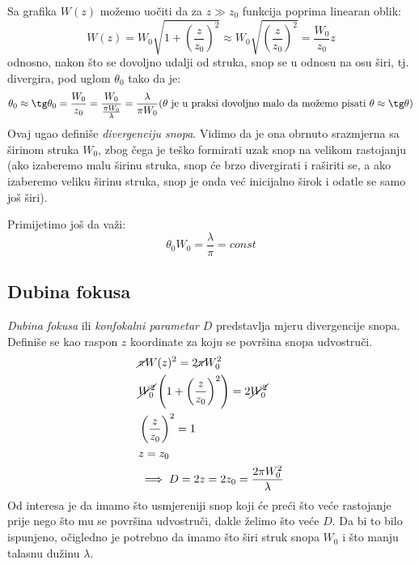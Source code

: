 \documentclass[fleqn]{report}
\begin{document}
Sa grafika $W(z)$ možemo uočiti da za $z \gg z_0$ funkcija poprima linearan oblik:
\begin{equation*}
    W(z) = W_0 \sqrt{1 + \left(\frac{z}{z_0}\right)^2} \approx W_0 \sqrt{\left(\frac{z}{z_0}\right)^2} = \frac{W_0}{z_0}z
\end{equation*}
odnosno, nakon što se dovoljno udalji od struka, snop se u odnosu na osu širi, tj. divergira, pod uglom $\theta_0$ tako da je:
\begin{align*}
    \theta_0 \approx \tg\theta_0 = \frac{W_0}{z_0} = \frac{W_0}{\frac{\pi W_0}{\lambda}} = \frac{\lambda}{\pi W_0} \text{($\theta$ je u praksi dovoljno malo da možemo pisati $\theta \approx \tg\theta$)}
\end{align*}
Ovaj ugao definiše \emph{divergenciju snopa}.
Vidimo da je ona obrnuto srazmjerna sa širinom struka $W_0$, zbog čega je teško formirati uzak snop na velikom rastojanju (ako izaberemo malu širinu struka, snop će brzo divergirati i raširiti se, a ako izaberemo veliku širinu struka, snop je onda već inicijalno širok i odatle se samo još širi).

Primijetimo još da važi:
\begin{equation*}
    \theta_0 W_0 = \frac{\lambda}{\pi} = const
\end{equation*}

\subsection{Dubina fokusa}

\emph{Dubina fokusa} ili \emph{konfokalni parametar} $D$ predstavlja mjeru divergencije snopa.
Definiše se kao raspon $z$ koordinate za koju se površina snopa udvostruči.
\begin{align*}
     & \cancel{\pi} W(z)^2 = 2 \cancel{\pi} W_0^2                                     \\
     & \cancel{W_0^2} \left(1 + \left(\frac{z}{z_0}\right)^2\right) = 2\cancel{W_0^2} \\
     & \left(\frac{z}{z_0}\right)^2 = 1                                               \\
     & z = z_0                                                                        \\
     & \implies D = 2z = 2z_0 = \frac{2\pi W_0^2}{\lambda}
\end{align*}
Od interesa je da imamo što usmjereniji snop koji će preći što veće rastojanje prije nego što mu se površina udvostruči, dakle želimo što veće $D$.
Da bi to bilo ispunjeno, očigledno je potrebno da imamo što širi struk snopa $W_0$ i što manju talasnu dužinu $\lambda$.
\end{document}
